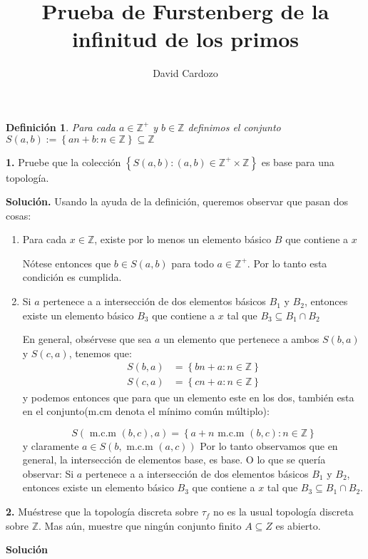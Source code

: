 \documentclass[notitlepage]{report}
\author{David Cardozo}
\title{Prueba de Furstenberg de la infinitud de los primos}
\newtheorem{define}{Definición}
\newcommand{\set}[1]{\left\lbrace #1 \right\rbrace}
\newcommand{\ZZ}{\mathbb{Z}}
\newcommand{\qt}[1]{\textrm{#1}}
\newcommand{\contained}{\subseteq}
\begin{document}
\maketitle

\begin{define}
	Para cada $a \in \ZZ^+ $ y $b \in \ZZ$ definimos el conjunto $S(a,b) := \set{an + b: n \in \ZZ} \contained \ZZ $
\end{define}
\textbf{1.} Pruebe que la colección $ \set{S(a,b) : (a,b) \in \ZZ^+ \times \ZZ} $ es base para una topología.

\textbf{Solución.}
Usando la ayuda de la definición, queremos observar que pasan dos cosas:
\begin{enumerate}
	\item Para cada $x \in \ZZ$, existe por lo menos un elemento básico $B$ que contiene a $x$
	
	Nótese entonces que $ b \in S(a,b) $ para todo $a \in \ZZ^+$. Por lo tanto esta condición es cumplida.
	
	\item Si $a$ pertenece a a intersección de dos elementos básicos $B_1$ y $ B_2$, entonces existe un elemento básico $B_3$ que contiene a $x$ tal que $ B_3 \contained B_1 \cap B_2$
	
	En general, obsérvese que sea $a$ un elemento que pertenece a ambos $S(b,a)$ y $S(c,a) $, tenemos que:
	\begin{align*}
	S(b,a) &= \set{bn + a: n \in \ZZ} \\
	S(c,a) &= \set{cn + a: n \in \ZZ}
	\end{align*}
	y podemos entonces que para que un elemento este en los dos, también esta en el conjunto(m.cm denota el mínimo común múltiplo):
	
	\[ S(\qt{ m.c.m } (b,c),a) = \set{a + n\qt{ m.c.m } (b,c) : n \in \ZZ}   \]
	y claramente $a \in S(b,\qt{ m.c.m } (a,c))  $
	Por lo tanto observamos que en general, la intersección de elementos base, es base. O lo que se quería observar: Si $a$ pertenece a a intersección de dos elementos básicos $B_1$ y $ B_2$, entonces existe un elemento básico $B_3$ que contiene a $x$ tal que $ B_3 \contained B_1 \cap B_2$.
\end{enumerate}


\textbf{2.} Muéstrese que la topología discreta sobre $\tau_f$ no es la usual topología discreta sobre $\ZZ$. Mas aún, muestre que ningún conjunto finito $ A \contained Z$ es abierto.

\textbf{Solución}
\end{document}
